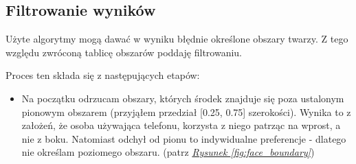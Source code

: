 \subsection{Filtrowanie wyników}
\label{section:face_detection_filter}

Użyte algorytmy mogą dawać w wyniku błędnie określone obszary twarzy. Z tego względu zwróconą tablicę obszarów poddaję filtrowaniu.

\par
Proces ten składa się z następujących etapów:

\begin{itemize}
    \item Na początku odrzucam obszary, których środek znajduje się poza ustalonym pionowym obszarem (przyjąłem przedział [0.25, 0.75] szerokości). Wynika to z założeń, że osoba używająca telefonu, korzysta z niego patrząc na wprost, a nie z boku. Natomiast odchył od pionu to indywidualne preferencje - dlatego nie określam poziomego obszaru. (patrz \hyperref[{fig:face_boundary}]{\textit{Rysunek \ref{fig:face_boundary}}})


\end{itemize}
